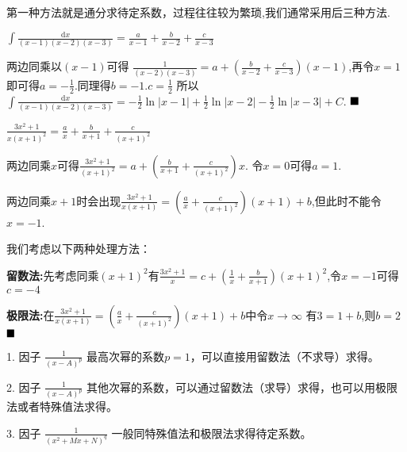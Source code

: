 \begin{remark}
    第一种方法就是通分求待定系数，过程往往较为繁琐,我们通常采用后三种方法.
\end{remark}

\begin{example}
    $
    \int \frac{\mathrm d x}{(x-1)(x-2)(x-3)} =\frac{a}{x-1} + \frac{b}{x-2} + \frac{c}{x-3}
    $
\end{example}
\begin{solution}[留数法]
    两边同乘以$(x-1)$可得
    $\frac{1}{(x-2)(x-3)} = a + (\frac{b}{x-2} + \frac{c}{x-3})(x-1)$,再令$x = 1$即可得$a = -\frac{1}{2}$.同理得$b=-1.c=\frac{1}{2}$
    所以$\int \frac{\mathrm d x}{(x-1)(x-2)(x-3)} = -\frac{1}{2}\ln|x-1| + \frac{1}{2}\ln|x-2| - \frac{1}{2}\ln|x-3| + C$. $\hfill \blacksquare$
\end{solution}

\begin{example}
    $\frac{3x^2 +1}{x(x+1)^2} = \frac a x + \frac{b}{x+1} + \frac{c}{(x+1)^2}$
\end{example}

\begin{solution}
    两边同乘$x$可得$\frac{3x^2 + 1}{(x+1)^2} = a + (\frac{b}{x+1} + \frac{c}{(x+1)^2})x$.
    令$x = 0$可得$a = 1$.

    两边同乘$x+1$时会出现$\frac{3x^2+1}{x(x+1)} = (\frac{a}{x}+ \frac{c}{(x+1)^2})(x+1) + b $,但此时不能令$ x = -1$.

    我们考虑以下两种处理方法：

    \textbf{留数法:}先考虑同乘$(x+1)^2$有$\frac{3x^2+1}{x}=c+(\frac{1}{x}+\frac{b}{x+1})(x+1)^2$,令$x = -1$可得$c = -4$

    \textbf{极限法:}在$\frac{3x^2+1}{x(x+1)} = (\frac{a}{x}+ \frac{c}{(x+1)^2})(x+1) + b $中令$x \to \infty$ 有$3=1+b$,则$b = 2 $
$\hfill \blacksquare$
\end{solution}

\begin{note}
1. 因子 \(\frac{1}{(x-A)^p}\) 最高次幂的系数$p=1$，可以直接用留数法（不求导）求得。

2. 因子 \(\frac{1}{(x-A)^p}\) 其他次幂的系数，可以通过留数法（求导）求得，也可以用极限法或者特殊值法求得。

3. 因子 \(\frac{1}{\left(x^2+Mx+N\right)^q}\) 一般同特殊值法和极限法求得待定系数。
\end{note}
